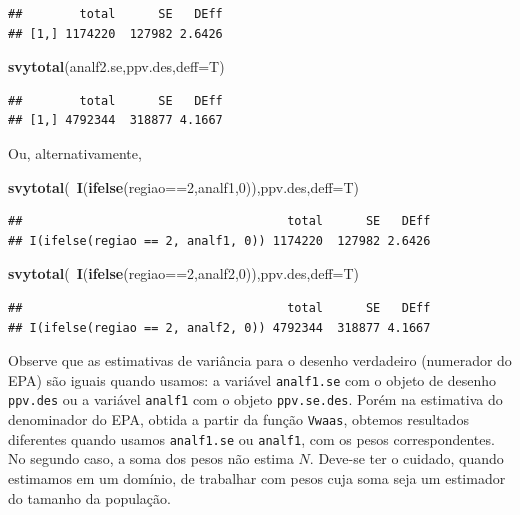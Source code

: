 \documentclass[]{book}
\newenvironment{Shaded}{\begin{snugshade}}{\end{snugshade}}
\newcommand{\KeywordTok}[1]{\textcolor[rgb]{0.13,0.29,0.53}{\textbf{{#1}}}}
\newcommand{\DataTypeTok}[1]{\textcolor[rgb]{0.13,0.29,0.53}{{#1}}}
\newcommand{\DecValTok}[1]{\textcolor[rgb]{0.00,0.00,0.81}{{#1}}}
\newcommand{\NormalTok}[1]{{#1}}
\numberwithin{example}{chapter}
\numberwithin{remark}{chapter}
\numberwithin{definition}{chapter}
\begin{document}
\begin{verbatim}
##        total      SE   DEff
## [1,] 1174220  127982 2.6426
\end{verbatim}

\begin{Shaded}
\begin{Highlighting}[]
\KeywordTok{svytotal}\NormalTok{(analf2.se,ppv.des,}\DataTypeTok{deff=}\NormalTok{T)}
\end{Highlighting}
\end{Shaded}

\begin{verbatim}
##        total      SE   DEff
## [1,] 4792344  318877 4.1667
\end{verbatim}

Ou, alternativamente,

\begin{Shaded}
\begin{Highlighting}[]
\KeywordTok{svytotal}\NormalTok{(~}\KeywordTok{I}\NormalTok{(}\KeywordTok{ifelse}\NormalTok{(regiao==}\DecValTok{2}\NormalTok{,analf1,}\DecValTok{0}\NormalTok{)),ppv.des,}\DataTypeTok{deff=}\NormalTok{T)}
\end{Highlighting}
\end{Shaded}

\begin{verbatim}
##                                     total      SE   DEff
## I(ifelse(regiao == 2, analf1, 0)) 1174220  127982 2.6426
\end{verbatim}

\begin{Shaded}
\begin{Highlighting}[]
\KeywordTok{svytotal}\NormalTok{(~}\KeywordTok{I}\NormalTok{(}\KeywordTok{ifelse}\NormalTok{(regiao==}\DecValTok{2}\NormalTok{,analf2,}\DecValTok{0}\NormalTok{)),ppv.des,}\DataTypeTok{deff=}\NormalTok{T)}
\end{Highlighting}
\end{Shaded}

\begin{verbatim}
##                                     total      SE   DEff
## I(ifelse(regiao == 2, analf2, 0)) 4792344  318877 4.1667
\end{verbatim}

Observe que as estimativas de variância para o desenho verdadeiro
(numerador do EPA) são iguais quando usamos: a variável
\texttt{analf1.se} com o objeto de desenho \texttt{ppv.des} ou a
variável \texttt{analf1} com o objeto \texttt{ppv.se.des}. Porém na
estimativa do denominador do EPA, obtida a partir da função
\texttt{Vwaas}, obtemos resultados diferentes quando usamos
\texttt{analf1.se} ou \texttt{analf1}, com os pesos correspondentes. No
segundo caso, a soma dos pesos não estima \(N\). Deve-se ter o cuidado,
quando estimamos em um domínio, de trabalhar com pesos cuja soma seja um
estimador do tamanho da população.
\end{document}
